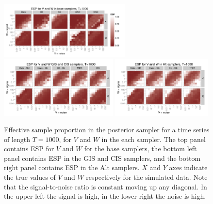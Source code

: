 \documentclass{article}
\begin{document}
\begin{figure}[!h]
\centering
\includegraphics[width=0.59\textwidth]{basecisESplot1000}
\includegraphics[width=0.53\textwidth]{altintESplotV1000}
\includegraphics[width=0.45\textwidth]{altintESplotW1000}
\caption{Effective sample proportion in the posterior sampler for a time series of length $T=1000$, for $V$ and $W$ in the each sampler. The top panel contains ESP for $V$ and $W$ for the base samplers, the bottom left panel contains ESP in the GIS and CIS samplers, and the bottom right panel contains ESP in the Alt samplers. $X$ and $Y$ axes indicate the true values of $V$ and $W$ respectively for the simulated data. Note that the signal-to-noise ratio is constant moving up any diagonal. In the upper left the signal is high, in the lower right the noise is high.}
\label{ESplot3}
\end{figure}
\end{document}
